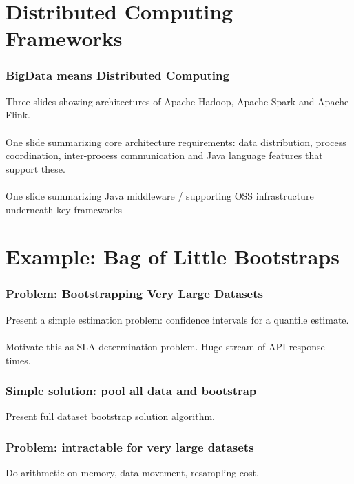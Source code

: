 \documentclass[14pt,mathserif]{beamer}
\begin{document}
\section[Distributed Computing]{Distributed Computing Frameworks}

\begin{frame}
  \frametitle{BigData means Distributed Computing}
Three slides showing architectures of Apache Hadoop, Apache Spark and Apache Flink.
\\
\\
One slide summarizing core architecture requirements: data distribution, process coordination, inter-process communication and Java language features that support these.
\\
\\
One slide summarizing Java middleware / supporting OSS infrastructure underneath key frameworks

\end{frame}

\section[Big Data Example]{Example: Bag of Little Bootstraps}

\begin{frame}
  \frametitle{Problem: Bootstrapping Very Large Datasets}
Present a simple estimation problem: confidence intervals for a quantile estimate.  
\\
\\
Motivate this as SLA determination problem. Huge stream of API response times.
\end{frame}

\begin{frame}
\frametitle{Simple solution: pool all data and bootstrap}
Present full dataset bootstrap solution algorithm.
\end{frame}

\begin{frame}
\frametitle{Problem: intractable for very large datasets}
Do arithmetic on memory, data movement, resampling cost.
\end{frame}
\end{document}
